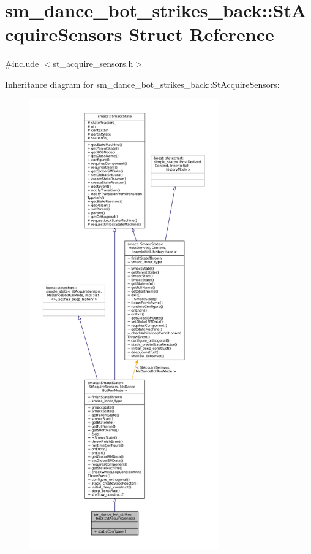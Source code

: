 \hypertarget{structsm__dance__bot__strikes__back_1_1StAcquireSensors}{}\section{sm\+\_\+dance\+\_\+bot\+\_\+strikes\+\_\+back\+:\+:St\+Acquire\+Sensors Struct Reference}
\label{structsm__dance__bot__strikes__back_1_1StAcquireSensors}


{\ttfamily \#include $<$st\+\_\+acquire\+\_\+sensors.\+h$>$}



Inheritance diagram for sm\+\_\+dance\+\_\+bot\+\_\+strikes\+\_\+back\+:\+:St\+Acquire\+Sensors\+:
\nopagebreak
\begin{figure}[H]
\begin{center}
\leavevmode
\includegraphics[height=550pt]{structsm__dance__bot__strikes__back_1_1StAcquireSensors__inherit__graph}
\end{center}
\end{figure}


